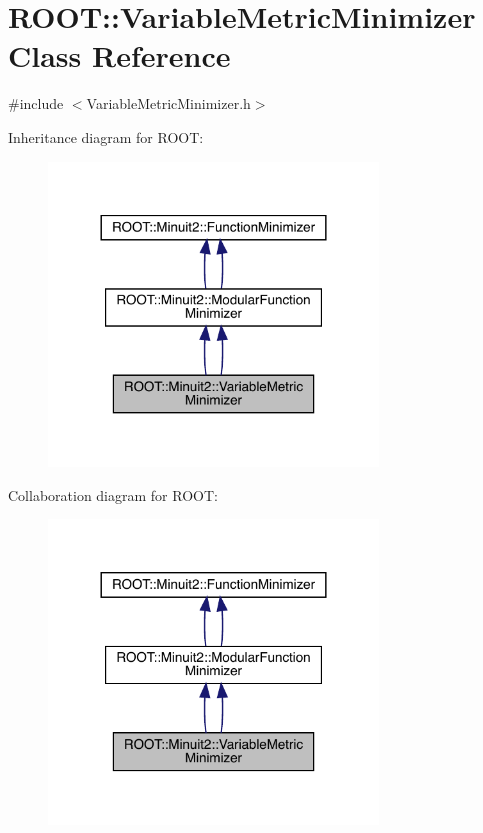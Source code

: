 \hypertarget{classROOT_1_1Minuit2_1_1VariableMetricMinimizer}{}\section{R\+O\+OT\+:\+:Variable\+Metric\+Minimizer Class Reference}
\label{classROOT_1_1Minuit2_1_1VariableMetricMinimizer}


{\ttfamily \#include $<$Variable\+Metric\+Minimizer.\+h$>$}



Inheritance diagram for R\+O\+OT\+:\nopagebreak
\begin{figure}[H]
\begin{center}
\leavevmode
\includegraphics[width=248pt]{dc/d1b/classROOT_1_1Minuit2_1_1VariableMetricMinimizer__inherit__graph}
\end{center}
\end{figure}


Collaboration diagram for R\+O\+OT\+:\nopagebreak
\begin{figure}[H]
\begin{center}
\leavevmode
\includegraphics[width=248pt]{dd/d50/classROOT_1_1Minuit2_1_1VariableMetricMinimizer__coll__graph}
\end{center}
\end{figure}
